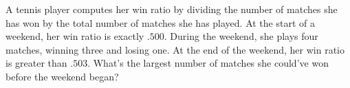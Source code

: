 A tennis player computes her win ratio by dividing the number of matches she has won by the total number of matches she has played. At the start of a weekend, her win ratio is exactly $.500$. During the weekend, she plays four matches, winning three and losing one. At the end of the weekend, her win ratio is greater than $.503$. What's the largest number of matches she could've won before the weekend began?